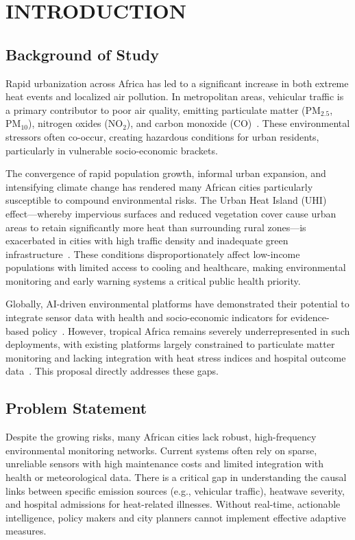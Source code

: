 \chapter{INTRODUCTION}

\section{Background of Study}
Rapid urbanization across Africa has led to a significant increase in both extreme heat events and localized air pollution. In metropolitan areas, vehicular traffic is a primary contributor to poor air quality, emitting particulate matter (PM$_{2.5}$, PM$_{10}$), nitrogen oxides (NO$_2$), and carbon monoxide (CO)~\cite{bhaskar2025}. These environmental stressors often co-occur, creating hazardous conditions for urban residents, particularly in vulnerable socio-economic brackets.

The convergence of rapid population growth, informal urban expansion, and intensifying climate change has rendered many African cities particularly susceptible to compound environmental risks. The Urban Heat Island (UHI) effect—whereby impervious surfaces and reduced vegetation cover cause urban areas to retain significantly more heat than surrounding rural zones—is exacerbated in cities with high traffic density and inadequate green infrastructure~\cite{assaf2023,gaur2026}. These conditions disproportionately affect low-income populations with limited access to cooling and healthcare, making environmental monitoring and early warning systems a critical public health priority.

Globally, AI-driven environmental platforms have demonstrated their potential to integrate sensor data with health and socio-economic indicators for evidence-based policy~\cite{mehryar2024,eze2025}. However, tropical Africa remains severely underrepresented in such deployments, with existing platforms largely constrained to particulate matter monitoring and lacking integration with heat stress indices and hospital outcome data~\cite{bainomugisha2024,gaur2026}. This proposal directly addresses these gaps.

\section{Problem Statement}
Despite the growing risks, many African cities lack robust, high-frequency environmental monitoring networks. Current systems often rely on sparse, unreliable sensors with high maintenance costs and limited integration with health or meteorological data. There is a critical gap in understanding the causal links between specific emission sources (e.g., vehicular traffic), heatwave severity, and hospital admissions for heat-related illnesses. Without real-time, actionable intelligence, policy makers and city planners cannot implement effective adaptive measures.

